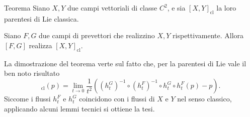 \documentclass{beamer}
\newenvironment{teoremab}{\begin{alertblock}{Teorema}}{\end{alertblock}}
\begin{document}
\begin{frame}
    \begin{teoremab}
        Siano $ X,Y $ due campi vettoriali di classe $ C^{2} $, e sia $ [X,Y]_{\text{cl}} $ la loro parentesi di Lie classica. 

        Siano $ F,G $ due campi di prevettori che realizzino $ X,Y $ rispettivamente. Allora $ [F,G] $ realizza $ [X,Y]_{\text{cl}} $.
    \end{teoremab}

    La dimostrazione del teorema verte sul fatto che, per la parentesi di Lie vale il ben noto risultato \begin{equation*}
        [X,Y]_{\text{cl}} (p) = \lim_{t\to 0} \frac{1}{t^{2}}\left(\left(h_{t}^{G} \right)^{-1} \circ \left(h_{t}^{F} \right)^{-1}\circ h_{t}^{G}\circ h_{t}^{F}(p) - p \right).
    \end{equation*}Siccome i flussi $ h_{t}^{F} $ e $ h_{t}^{G} $ coincidono con i flussi di $ X $ e $ Y $ nel senso classico, applicando alcuni lemmi tecnici si ottiene la tesi.

    
    

\end{frame}
\end{document}

